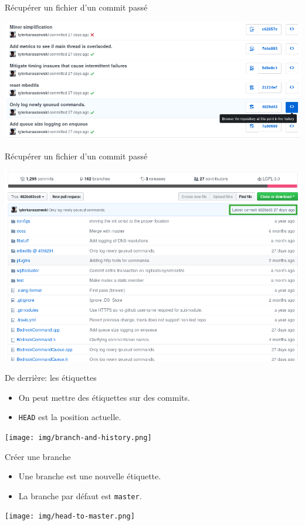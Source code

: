 \documentclass{beamer}
\begin{document}
\begin{frame}{Récupérer un fichier d'un commit passé}
    \begin{center}
    	\includegraphics[scale=0.3]{img/rollback_2.png}
    \end{center}
\end{frame}

\begin{frame}{Récupérer un fichier d'un commit passé}
    \begin{center}
    	\includegraphics[scale=0.3]{img/rollback_3.png}
    \end{center}
\end{frame}

\begin{frame}{De derrière: les étiquettes}
    \begin{itemize}
        \item On peut mettre des étiquettes sur des commits.
        \item \texttt{HEAD} est la position actuelle.
    \end{itemize}
    \texttt{[image: img/branch-and-history.png]}
\end{frame}

\begin{frame}{Créer une branche}
    \begin{itemize}
        \item Une branche est une nouvelle étiquette.
        \item La branche par défaut est \texttt{master}.
    \end{itemize}
    \begin{center}
        \texttt{[image: img/head-to-master.png]}
    \end{center}
\end{frame}
\end{document}
